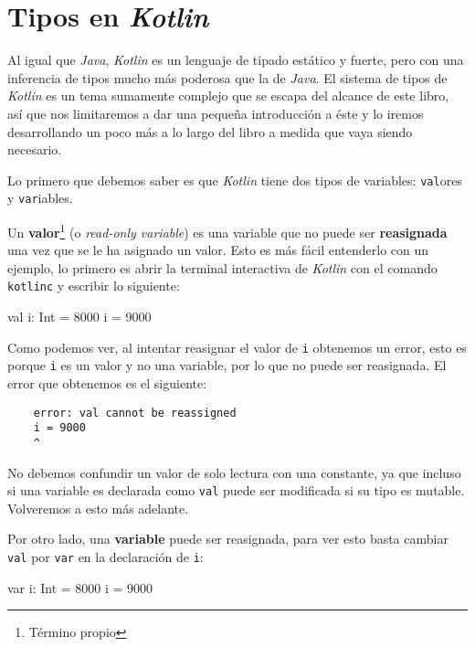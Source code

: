 \section{Tipos en \textit{Kotlin}}
  Al igual que \textit{Java}, \textit{Kotlin} es un lenguaje de tipado estático y fuerte, pero con 
  una inferencia de tipos mucho más poderosa que la de \textit{Java}.
  El sistema de tipos de \textit{Kotlin} es un tema sumamente complejo que se escapa del alcance de 
  este libro, así que nos limitaremos a dar una pequeña introducción a éste y lo iremos
  desarrollando un poco más a lo largo del libro a medida que vaya siendo necesario.

  Lo primero que debemos saber es que \textit{Kotlin} tiene dos tipos de variables: 
  \texttt{val}ores y \texttt{var}iables.

  Un \textbf{valor}\footnote{Término propio} (o \textit{read-only variable}) es una variable que no 
  puede ser \textbf{reasignada} una vez que se le ha asignado un valor.
  Esto es más fácil entenderlo con un ejemplo, lo primero es abrir la terminal interactiva de
  \textit{Kotlin} con el comando \texttt{kotlinc} y escribir lo siguiente:

  \begin{kotlin}
    val i: Int = 8000
    i = 9000
  \end{kotlin}

  Como podemos ver, al intentar reasignar el valor de \texttt{i} obtenemos un error, esto es porque
  \texttt{i} es un valor y no una variable, por lo que no puede ser reasignada.
  El error que obtenemos es el siguiente:
  \begin{verbatim}
    error: val cannot be reassigned
    i = 9000
    ^
  \end{verbatim}

  \begin{important}
    No debemos confundir un valor de solo lectura con una constante, ya que incluso si una variable
    es declarada como \texttt{val} puede ser modificada si su tipo es mutable.
    Volveremos a esto más adelante.
  \end{important}

  Por otro lado, una \textbf{variable} puede ser reasignada, para ver esto basta cambiar 
  \texttt{val} por \texttt{var} en la declaración de \texttt{i}:

  \begin{kotlin}
    var i: Int = 8000
    i = 9000
  \end{kotlin}

